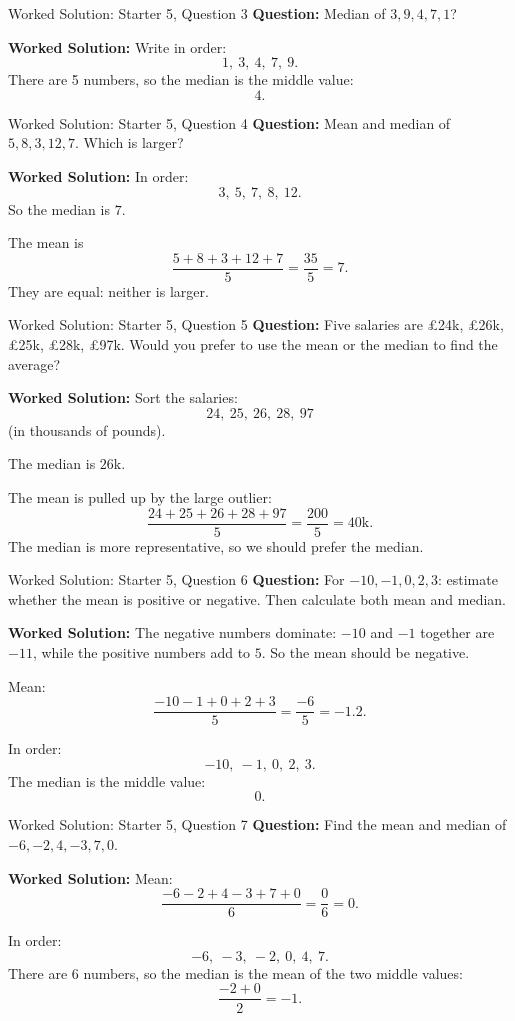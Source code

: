 \documentclass{beamer}
\begin{document}
\begin{frame}{Worked Solution: Starter 5, Question 3}
\textbf{Question:} Median of \(3, 9, 4, 7, 1\)?

\textbf{Worked Solution:}
Write in order:
\[
1,\ 3,\ 4,\ 7,\ 9.
\]
There are 5 numbers, so the median is the middle value:
\[
4.
\]
\end{frame}

\begin{frame}{Worked Solution: Starter 5, Question 4}
\textbf{Question:} Mean and median of \(5, 8, 3, 12, 7\). Which is larger?

\textbf{Worked Solution:}
In order:
\[
3,\ 5,\ 7,\ 8,\ 12.
\]
So the median is \(7\).

The mean is
\[
\frac{5 + 8 + 3 + 12 + 7}{5}
= \frac{35}{5}
= 7.
\]
They are equal: neither is larger.
\end{frame}

\begin{frame}{Worked Solution: Starter 5, Question 5}
\textbf{Question:} Five salaries are £24k, £26k, £25k, £28k, £97k. Would you prefer to use the mean or the median to find the average?

\textbf{Worked Solution:}
Sort the salaries:
\[
24,\ 25,\ 26,\ 28,\ 97
\]
(in thousands of pounds).

The median is \(26\)k.

The mean is pulled up by the large outlier:
\[
\frac{24 + 25 + 26 + 28 + 97}{5}
= \frac{200}{5}
= 40\text{k}.
\]
The median is more representative, so we should prefer the median.
\end{frame}

\begin{frame}{Worked Solution: Starter 5, Question 6}
\textbf{Question:} For \(-10, -1, 0, 2, 3\): estimate whether the mean is positive or negative. Then calculate both mean and median.

\textbf{Worked Solution:}
The negative numbers dominate: \(-10\) and \(-1\) together are \(-11\), while the positive numbers add to \(5\). So the mean should be negative.

Mean:
\[
\frac{-10 - 1 + 0 + 2 + 3}{5}
= \frac{-6}{5}
= -1.2.
\]

In order:
\[
-10,\ -1,\ 0,\ 2,\ 3.
\]
The median is the middle value:
\[
0.
\]
\end{frame}

\begin{frame}{Worked Solution: Starter 5, Question 7}
\textbf{Question:} Find the mean and median of \(-6, -2, 4, -3, 7, 0\).

\textbf{Worked Solution:}
Mean:
\[
\frac{-6 - 2 + 4 - 3 + 7 + 0}{6}
= \frac{0}{6}
= 0.
\]

In order:
\[
-6,\ -3,\ -2,\ 0,\ 4,\ 7.
\]
There are 6 numbers, so the median is the mean of the two middle values:
\[
\frac{-2 + 0}{2} = -1.
\]
\end{frame}
\end{document}
